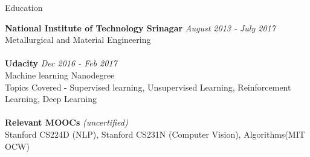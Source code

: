 \documentclass{resume} %
\begin{document}
\begin{rSection}{Education}

{\bf National Institute of Technology Srinagar} \hfill {\em August 2013 - July 2017} \\
Metallurgical and Material Engineering  \\
\\
{\bf Udacity } \hfill {\em Dec 2016 - Feb 2017}\\
Machine learning Nanodegree\\
Topics Covered - Supervised learning, Unsupervised Learning, Reinforcement Learning, Deep Learning\\
\\
{\bf Relevant MOOCs }\textit{ (uncertified)}\\
Stanford CS224D (NLP), Stanford CS231N (Computer Vision), Algorithms(MIT OCW)

\end{rSection}
\end{document}
